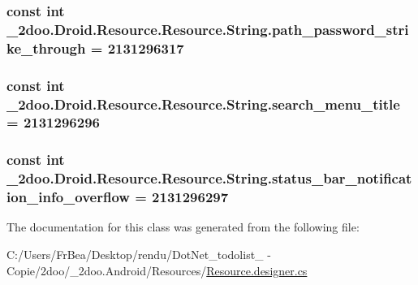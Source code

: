 \hypertarget{class__2doo_1_1_droid_1_1_resource_1_1_string_043836fcea7d779ac6fbb6759c946bbe}{
\subsubsection[{path\_\-password\_\-strike\_\-through}]{\setlength{\rightskip}{0pt plus 5cm}const int \_\-2doo.Droid.Resource.Resource.String.path\_\-password\_\-strike\_\-through = 2131296317}}
\label{class__2doo_1_1_droid_1_1_resource_1_1_string_043836fcea7d779ac6fbb6759c946bbe}


\hypertarget{class__2doo_1_1_droid_1_1_resource_1_1_string_a3693430f10928c6365aa825d431bf4e}{
\subsubsection[{search\_\-menu\_\-title}]{\setlength{\rightskip}{0pt plus 5cm}const int \_\-2doo.Droid.Resource.Resource.String.search\_\-menu\_\-title = 2131296296}}
\label{class__2doo_1_1_droid_1_1_resource_1_1_string_a3693430f10928c6365aa825d431bf4e}


\hypertarget{class__2doo_1_1_droid_1_1_resource_1_1_string_96da752ee14cfe4d786c63f55adba81b}{
\subsubsection[{status\_\-bar\_\-notification\_\-info\_\-overflow}]{\setlength{\rightskip}{0pt plus 5cm}const int \_\-2doo.Droid.Resource.Resource.String.status\_\-bar\_\-notification\_\-info\_\-overflow = 2131296297}}
\label{class__2doo_1_1_droid_1_1_resource_1_1_string_96da752ee14cfe4d786c63f55adba81b}




The documentation for this class was generated from the following file:\begin{CompactItemize}
\item 
C:/Users/FrBea/Desktop/rendu/DotNet\_\-todolist\_ - Copie/2doo/\_\-2doo.Android/Resources/\hyperlink{_resource_8designer_8cs}{Resource.designer.cs}\end{CompactItemize}
